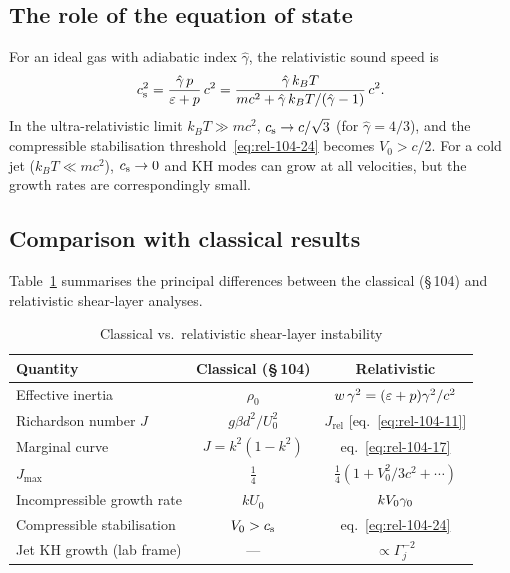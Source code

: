 \subsection{The role of the equation of state}
\label{sec:rel-11-104-jets-eos}

For an ideal gas with adiabatic index $\hat\gamma$, the relativistic
sound speed is
\begin{equation}
\label{eq:rel-104-27}
c_{\mathrm{s}}^2 = \frac{\hat\gamma\,p}{\varepsilon+p}\,c^2
  = \frac{\hat\gamma\,k_B T}{m c^2 + \hat\gamma\,k_B T/(\hat\gamma-1)}\,c^2.
\end{equation}
In the ultra-relativistic limit $k_B T\gg mc^2$,
$c_{\mathrm{s}}\to c/\sqrt{3}$ (for $\hat\gamma=4/3$), and the compressible
stabilisation threshold~\eqref{eq:rel-104-24} becomes $V_0>c/2$.
For a cold jet ($k_BT\ll mc^2$), $c_{\mathrm{s}}\to 0$ and KH modes can grow
at all velocities, but the growth rates are correspondingly small.

\subsection{Comparison with classical results}
\label{sec:rel-11-104-jets-comparison}

Table~\ref{tab:rel-104-comparison} summarises the principal differences
between the classical (\S\,104) and relativistic shear-layer analyses.

\begin{table}[htbp]
\centering
\caption{Classical vs.\ relativistic shear-layer instability}
\label{tab:rel-104-comparison}
\begin{tabular}{lcc}
\hline\hline
Quantity & Classical (\S\,104) & Relativistic \\
\hline
Effective inertia & $\rho_0$ & $w\,\gamma^2 = (\varepsilon+p)\gamma^2/c^2$ \\
Richardson number $J$ & $g\beta d^2/U_0^2$ & $J_{\mathrm{rel}}$
  [eq.~\eqref{eq:rel-104-11}] \\
Marginal curve & $J=k^2(1-k^2)$ & eq.~\eqref{eq:rel-104-17} \\
$J_{\max}$ & $\tfrac{1}{4}$ & $\tfrac{1}{4}(1+V_0^2/3c^2+\cdots)$ \\
Incompressible growth rate & $kU_0$ & $k V_0\gamma_0$ \\
Compressible stabilisation & $V_0 > c_{\mathrm{s}}$ & eq.~\eqref{eq:rel-104-24} \\
Jet KH growth (lab frame) & --- & $\propto\Gamma_j^{-2}$ \\
\hline\hline
\end{tabular}
\end{table}


